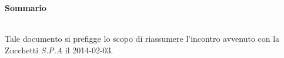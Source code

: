 \noindent\begin{Large}\textbf{Sommario}\end{Large}\\
\noindent Tale documento si prefigge lo scopo di riassumere l'incontro avvenuto con la Zucchetti \textit{S.P.A} il 2014-02-03.\\


